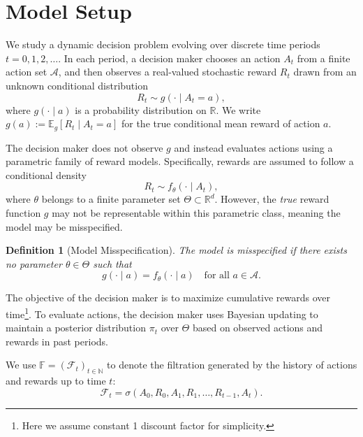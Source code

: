 \documentclass[12pt]{article}
\newtheorem{definition}{Definition}
\begin{document}
\section{Model Setup}

We study a dynamic decision problem evolving over discrete time periods $t = 0,1,2,\ldots$. In each period, a decision maker chooses an action $A_t$ from a finite action set $\mathcal A$, and then observes a real-valued stochastic reward $R_t$ drawn from an unknown conditional distribution
\begin{equation}\label{eq:true_reward}
R_t \sim g(\cdot \mid A_t = a),
\end{equation}
where $g(\cdot \mid a)$ is a probability distribution on $\mathbb R$. We write $g(a) := \mathbb{E}_g[R_t \mid A_t = a]$ for the true conditional mean reward of action $a$.

The decision maker does not observe $g$ and instead evaluates actions using a parametric family of reward models. Specifically, rewards are assumed to follow a conditional density
\begin{equation}\label{eq:model_reward}
R_t \sim f_\theta(\cdot \mid A_t),
\end{equation}
where $\theta$ belongs to a finite parameter set $\Theta \subset \mathbb R^d$. However, the \emph{true} reward function \(g\) may not be representable within this parametric class, meaning the model may be misspecified.

\begin{definition}[Model Misspecification]\label{def:misspec}
The model is misspecified if there exists no parameter
$\theta \in \Theta$ such that
\[
g(\cdot \mid a) = f_\theta(\cdot \mid a)
\quad \text{for all } a \in \mathcal A.
\]
\end{definition}

The objective of the decision maker is to maximize cumulative rewards over time\footnote{Here we assume constant 1 discount factor for simplicity.}. To evaluate actions, the decision maker uses Bayesian updating to maintain a posterior distribution $\pi_t$ over $\Theta$ based on observed actions and rewards in past periods.

We use $\mathbb F = (\mathcal F_t)_{t \in \mathbb N}$ to denote the filtration generated by the history of actions and rewards up to time $t$:
\begin{equation}
\mathcal{F}_t = \sigma(A_0, R_0, A_1, R_1, \ldots, R_{t-1}, A_t).
\label{eq:filtration}
\end{equation}
\end{document}
